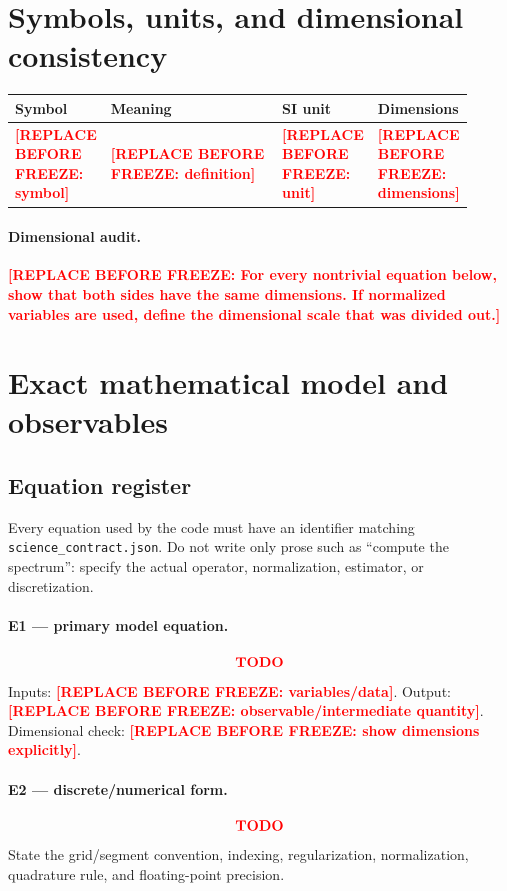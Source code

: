 \documentclass[11pt,a4paper]{article}
\newcommand{\SSTTODO}[1]{\ifmmode\text{\color{red}\bfseries TODO}\else\textcolor{red}{\textbf{[REPLACE BEFORE FREEZE: #1]}}\fi}
\begin{document}
\section{Symbols, units, and dimensional consistency}
\begin{longtable}{p{0.18\linewidth}p{0.45\linewidth}p{0.14\linewidth}p{0.14\linewidth}}
\toprule
Symbol & Meaning & SI unit & Dimensions \\
\midrule
\SSTTODO{symbol} & \SSTTODO{definition} & \SSTTODO{unit} & \SSTTODO{dimensions} \\
\bottomrule
\end{longtable}

\paragraph{Dimensional audit.}
\SSTTODO{For every nontrivial equation below, show that both sides have the same dimensions. If normalized variables are used, define the dimensional scale that was divided out.}

\section{Exact mathematical model and observables}
\subsection{Equation register}
Every equation used by the code must have an identifier matching \texttt{science\_contract.json}. Do not write only prose such as ``compute the spectrum'': specify the actual operator, normalization, estimator, or discretization.

\paragraph{E1 --- primary model equation.}
\begin{equation}
\SSTTODO{Insert the exact continuous equation, with all coefficients and boundary/closure assumptions defined.}
\label{eq:E1}
\end{equation}
\noindent Inputs: \SSTTODO{variables/data}. Output: \SSTTODO{observable/intermediate quantity}.\\
Dimensional check: \SSTTODO{show dimensions explicitly}.

\paragraph{E2 --- discrete/numerical form.}
\begin{equation}
\SSTTODO{Insert the actual discrete estimator/operator evaluated by Python/C++/SYCL.}
\label{eq:E2}
\end{equation}
\noindent State the grid/segment convention, indexing, regularization, normalization, quadrature rule, and floating-point precision.
\end{document}
